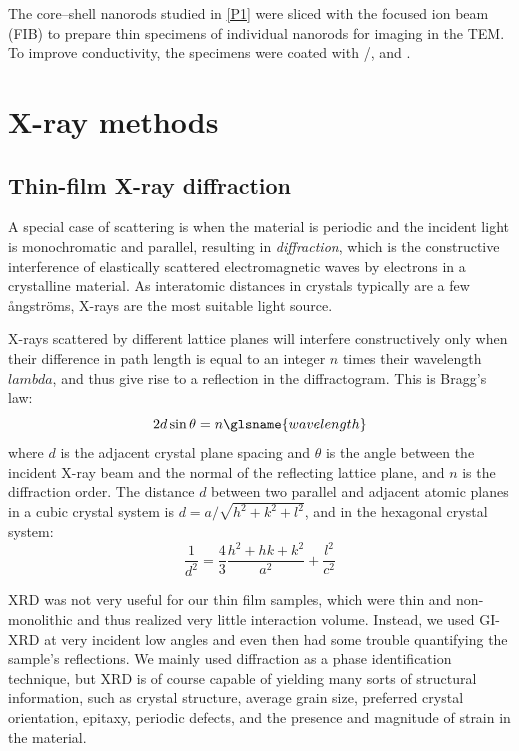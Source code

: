 \documentclass[webedition,openright,titles,swedish,english]{LuaUUThesis}\usepackage[]{graphicx}\usepackage[]{xcolor}
\begin{document}
The core--shell nanorods studied in \cref{P1} were sliced with the
focused ion beam (FIB) to prepare thin specimens of individual nanorods for imaging in the \gls{TEM}.
To improve conductivity, the specimens were coated with /, and .




\section{X-ray methods}%
\label{methods:xray}

\subsection{Thin-film X-ray diffraction}%
\label{methods:XRD}

A special case of scattering is when the material is periodic and the
incident light is monochromatic and parallel, resulting in \emph{diffraction},
which is
the constructive interference of elastically scattered electromagnetic waves
by electrons in a crystalline material.
As interatomic distances in crystals typically are a few ångströms,
X-rays are the most suitable light source.

X-rays scattered by different lattice planes will interfere constructively only
when their difference in path length is equal to an integer $n$ times their
wavelength $lambda$, and thus give rise to a reflection in the diffractogram.
This is Bragg's law:
\begin{equation}\label{eq:xrd-bragg}
2d\sin\theta = n\glsname{wavelength}
\end{equation}
where $d$ is the adjacent crystal plane spacing and $\theta$ is the angle
between the incident X-ray beam and the normal of the reflecting lattice plane,
and $n$ is the diffraction order.
The distance $d$ between two parallel and adjacent atomic planes in
a cubic crystal system is $d = a/\sqrt{h^2+k^2+l^2}$, and in the
hexagonal crystal system:
\begin{equation}\label{eq:hexagonal-dhkl}
\frac{1}{d^2} = \frac{4}{3}\frac{h^2 + hk + k^2}{a^2} + \frac{l^2}{c^2}
\end{equation}

\Gls{XRD} was not very useful for our thin film samples, which were thin
and non-monolithic and thus realized very little interaction volume.
Instead, we used \gls{GI-XRD} at very incident low angles and even then had some
trouble quantifying the sample's reflections.
We mainly used diffraction as a phase identification technique, but \gls{XRD}
is of course capable of yielding many sorts of structural information,
such as crystal structure, average grain size, preferred crystal orientation,
epitaxy, periodic defects,
and the presence and magnitude of strain in the material.
\end{document}

